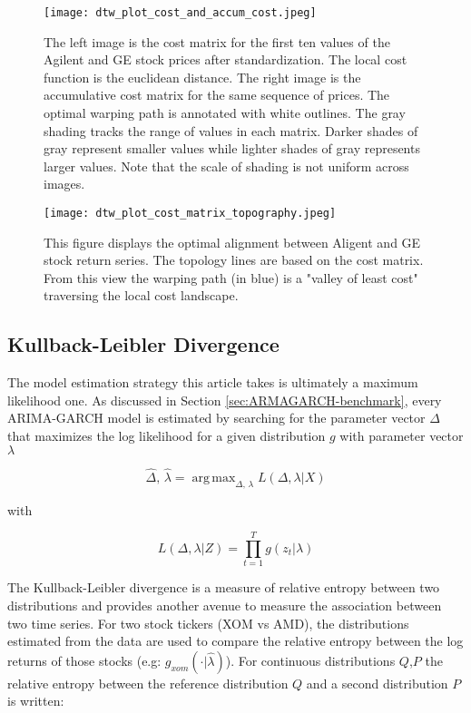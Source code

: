 \documentclass[12pt]{article}
\DeclareMathOperator*{\argmax}{arg\,max}
\begin{document}
\begin{figure}
    \centering
    \texttt{[image: dtw\_plot\_cost\_and\_accum\_cost.jpeg]}
    \caption{The left image is the cost matrix for the first ten values of the Agilent and GE stock prices after standardization. The local cost function is the euclidean distance. The right image is the accumulative cost matrix for the same sequence of prices. The optimal warping path is annotated with white outlines. The gray shading tracks the range of values in each matrix. Darker shades of gray represent smaller values while lighter shades of gray represents larger values. Note that the scale of shading is not uniform across images.}
    \label{fig:dtw_plot_cost_and_accum_cost}
\end{figure}

\begin{figure}
    \centering
    \texttt{[image: dtw\_plot\_cost\_matrix\_topography.jpeg]}
    \caption{This figure displays the optimal alignment between Aligent and GE stock return series. The topology lines are based on the cost matrix. From this view the warping path (in blue) is a "valley of least cost" traversing the local cost landscape.}
    \label{fig:dtw_plot_cost_matrix_topography}
\end{figure}


\pagebreak


\subsection{Kullback-Leibler Divergence} \label{sec:KL-Divergence}

The model estimation strategy this article takes is ultimately a maximum likelihood one. As discussed in Section \ref{sec:ARMAGARCH-benchmark}, every ARIMA-GARCH model is estimated by searching for the parameter vector $\Delta$ that maximizes the log likelihood for a given distribution $g$ with parameter vector $\lambda$

\begin{equation}
    \hat{\Delta},\, \hat{\lambda} = \argmax_{\Delta,\, \lambda} L(\Delta, \lambda | X)
\end{equation}

with 

\begin{equation}
    L(\Delta, \lambda | Z) = \prod_{t=1}^{T} g(z_{t}| \lambda)
\end{equation}

The Kullback-Leibler divergence is a measure of relative entropy between two distributions and provides another avenue to measure the association between two time series. For two stock tickers (XOM vs AMD), the distributions estimated from the data are used to compare the relative entropy between the log returns of those stocks (e.g: $g_{xom}(\cdot|\hat{\lambda})$). For continuous distributions $Q$,$P$ the relative entropy between the reference distribution $Q$ and a second distribution $P$ is written:
\end{document}
